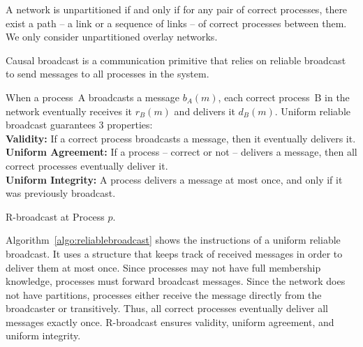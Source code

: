 
\begin{definition}
  A network is unpartitioned if and only if for any pair of correct processes,
  there exist a path -- a link or a sequence of links -- of correct processes
  between them. We only consider unpartitioned overlay networks.
\end{definition}

Causal broadcast is a communication primitive that relies on reliable broadcast
to send messages to all processes in the system.


\begin{definition}
  When a process~A broadcasts a message $b_A(m)$, each correct process~B in the
  network eventually receives it $r_B(m)$ and delivers it $d_B(m)$.
  Uniform reliable broadcast guarantees 3 properties: \\
  \textbf{Validity:} If a correct process broadcasts a message, then it
  eventually delivers it. \\
  \textbf{Uniform Agreement:} If a process -- correct or not -- delivers a
  message, then all correct processes eventually deliver it. \\
  \textbf{Uniform Integrity:} A process delivers a message at most once, and
  only if it was previously broadcast.
\end{definition}

\begin{algorithm}[h]
  
  \caption{\label{algo:reliablebroadcast}R-broadcast at Process $p$.}
\end{algorithm}

Algorithm~\ref{algo:reliablebroadcast} shows the instructions of a uniform
reliable broadcast. It uses a structure that keeps track of received messages in
order to deliver them at most once.  Since processes may not have full
membership knowledge, processes must forward broadcast messages. Since the
network does not have partitions, processes either receive the message directly
from the broadcaster or transitively. Thus, all correct processes eventually
deliver all messages exactly once. R-broadcast ensures validity, uniform
agreement, and uniform integrity.

